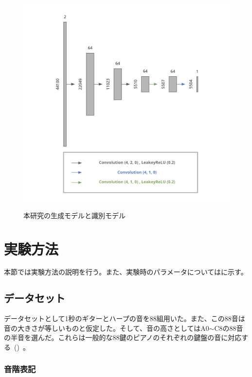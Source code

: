 \begin{figure}[b]
\begin{minipage}[b]{0.6\columnwidth}
\includegraphics[width=\columnwidth]{figure/pr_discriminator.png}
\label{fig:pr_dis}
\end{minipage}
\caption{本研究の生成モデルと識別モデル}
\label{fig:pr}
\end{figure}

\clearpage

\section{実験方法}

本節では実験方法の説明を行う。また、実験時のパラメータについてはに示す。

\subsection{データセット}

データセットとして1秒のギターとハープの音を88組用いた。また、この88音は音の大きさが等しいものと仮定した。そして、音の高さとしてはA0$\sim$C8の88音の半音を選んだ。これらは一般的な88鍵のピアノのそれぞれの鍵盤の音に対応する~()~。

\subsubsection{音階表記}

